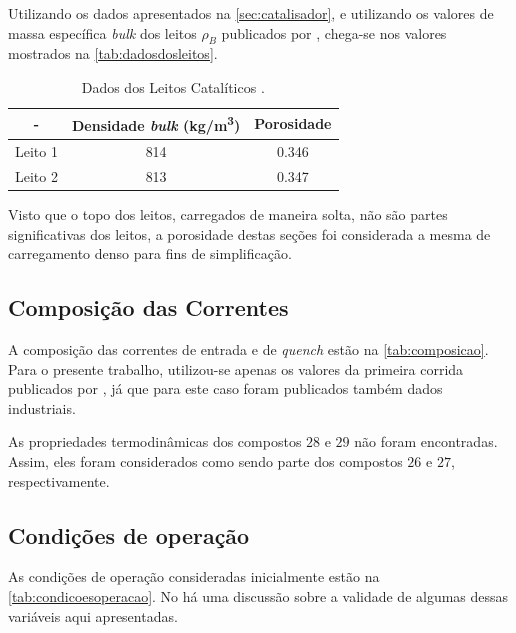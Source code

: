 Utilizando os dados apresentados na \autoref{sec:catalisador}, e utilizando os
valores de massa específica \emph{bulk} dos leitos $\rho_{B}$ publicados por
, chega-se nos valores mostrados na
\autoref{tab:dadosdosleitos}.

\begin{table}[!htb]
\begin{center}
\caption{Dados dos Leitos Catalíticos \cite{Rojas2014a}.}
\label{tab:dadosdosleitos}
\small
\begin{tabular}{ccc}
{ - } & {Densidade \emph{bulk} (\si{kg/m^3})} & {Porosidade} 
\\
\hline
{Leito 1} & 814 & 0.346 \\
{Leito 2} & 813 & 0.347 \\
\bottomrule
\end{tabular}
\end{center}
\end{table}

Visto que o topo dos leitos, carregados de maneira solta, não são partes
significativas dos leitos, a porosidade destas seções foi
considerada a mesma de carregamento denso para fins de simplificação. 

\subsection{Composição das Correntes} \label{sec:composicaocorrentes}

A composição das correntes de entrada e de \emph{quench} estão na
\autoref{tab:composicao}. Para o presente trabalho, utilizou-se
apenas os valores da primeira corrida publicados por , já
que para este caso foram publicados também dados industriais.

As propriedades termodinâmicas dos compostos $28$ e $29$ não foram
encontradas. Assim, eles foram considerados como sendo parte dos compostos
$26$ e $27$, respectivamente.

\subsection{Condições de operação} \label{sec:condicoesdeoperacao}

As condições de operação consideradas inicialmente estão na
\autoref{tab:condicoesoperacao}. No \label{chap:resultados} há uma discussão
sobre a validade de algumas dessas variáveis aqui apresentadas.

